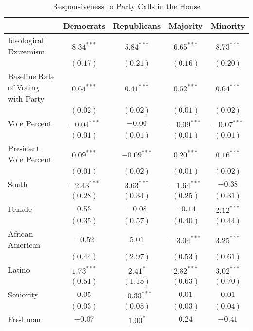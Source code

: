 \documentclass[12pt]{article}
\begin{document}
\begin{table}[H]
	\begin{center}
		\caption{Responsiveness to Party Calls in the House}
		\begin{tabular}{l c c c c }
			\hline
			& Democrats & Republicans & Majority & Minority \\
			\hline
			Ideological Extremism & $8.34^{***}$  & $5.84^{***}$  & $6.65^{***}$  & $8.73^{***}$  \\
			& $(0.17)$      & $(0.21)$      & $(0.16)$      & $(0.20)$      \\
			Baseline Rate of Voting with Party              & $0.64^{***}$  & $0.41^{***}$  & $0.52^{***}$  & $0.64^{***}$  \\
			& $(0.02)$      & $(0.02)$      & $(0.01)$      & $(0.02)$      \\
			Vote Percent                & $-0.04^{***}$ & $-0.00$       & $-0.09^{***}$ & $-0.07^{***}$ \\
			& $(0.01)$      & $(0.01)$      & $(0.01)$      & $(0.01)$      \\
			President Vote Percent          & $0.09^{***}$  & $-0.09^{***}$ & $0.20^{***}$  & $0.16^{***}$  \\
			& $(0.01)$      & $(0.02)$      & $(0.01)$      & $(0.02)$      \\
			South                  & $-2.43^{***}$ & $3.63^{***}$  & $-1.64^{***}$ & $-0.38$       \\
			& $(0.28)$      & $(0.34)$      & $(0.25)$      & $(0.31)$      \\
			Female                 & $0.53$        & $-0.08$       & $-0.14$       & $2.12^{***}$  \\
			& $(0.35)$      & $(0.57)$      & $(0.40)$      & $(0.44)$      \\
			African American                   & $-0.52$       & $5.01$        & $-3.04^{***}$ & $3.25^{***}$  \\
			& $(0.44)$      & $(2.97)$      & $(0.53)$      & $(0.61)$      \\
			Latino                 & $1.73^{***}$  & $2.41^{*}$    & $2.82^{***}$  & $3.02^{***}$  \\
			& $(0.51)$      & $(1.15)$      & $(0.63)$      & $(0.70)$      \\
			Seniority              & $0.05$        & $-0.33^{***}$ & $0.01$        & $0.01$        \\
			& $(0.03)$      & $(0.05)$      & $(0.03)$      & $(0.04)$      \\
			Freshman               & $-0.07$       & $1.00^{*}$    & $0.24$        & $-0.41$       \\

\end{tabular}
\end{center}
\end{table}
\end{document}
